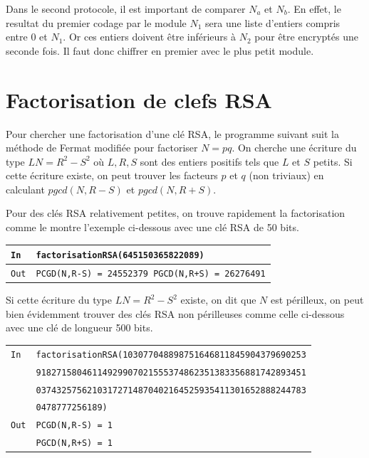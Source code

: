 \documentclass[titlepage]{article}
\begin{document}
    

    Dans le second protocole, il est important de comparer $N_a$ et $N_b$. En effet, le resultat du premier codage par le module $N_1$ sera une liste d'entiers compris entre 0 et $N_1$. Or ces entiers doivent être inférieurs à $N_2$ pour être encryptés une seconde fois. Il faut donc chiffrer en premier avec le plus petit module.


    \section{Factorisation de clefs RSA}
    Pour chercher une factorisation d'une clé RSA, le programme suivant suit la méthode de Fermat modifiée pour factoriser $N = pq$.
    On cherche une écriture du type $LN = R^2 - S^2$ où $L,R,S$ sont des entiers positifs tels que $L$ et $S$ petits.
    Si cette écriture existe, on peut trouver les facteurs $p$ et $q$ (non triviaux) en calculant $pgcd(N,R-S)$ et $ pgcd(N,R+S)$.

    

    Pour des clés RSA relativement petites, on trouve rapidement la factorisation comme le montre l'exemple ci-dessous avec une clé RSA de 50 bits. \bigbreak

    \begin{tabularx}{12cm}{|p{0.60cm}|X|}
        \hline
        \rowcolor{gray}
        \texttt{In}
        & 
        \texttt{factorisationRSA(645150365822089)}
        \\
        \hline
        \texttt{Out}
        &
        \texttt{PCGD(N,R-S) =  24552379 \newline
        PGCD(N,R+S) =  26276491}
        \\
        \hline
    \end{tabularx}
    \bigbreak
    
    Si cette écriture du type $LN = R^2 - S^2$ existe, on dit que $N$ est périlleux, on peut bien évidemment trouver des clés RSA non périlleuses comme celle ci-dessous avec une clé de longueur 500 bits.\bigbreak
    
    \begin{tabularx}{12cm}{|p{0.60cm}|X|}
        \hline
        \rowcolor{gray} \texttt{In} & \texttt{factorisationRSA(103077048898751646811845904379690253} \\
        \rowcolor{gray} & \texttt{91827158046114929907021555374862351383356881742893451} \\
        \rowcolor{gray} & \texttt{03743257562103172714870402164525935411301652888244783} \\
        \rowcolor{gray} & \texttt{0478777256189)} \\
        \hline
        \texttt{Out} & \texttt{PCGD(N,R-S) =  1} \\
        & \texttt{PGCD(N,R+S) =  1} \\
        \hline
    \end{tabularx}
    \bigbreak
    
\end{document}
